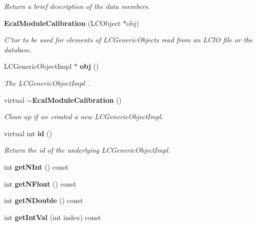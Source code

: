\begin{DoxyCompactItemize}
\begin{DoxyCompactList}\small\item\em Return a brief description of the data members. \item\end{DoxyCompactList}\item 
{\bf EcalModuleCalibration} (LCObject $\ast$obj)
\begin{DoxyCompactList}\small\item\em C'tor to be used for elements of LCGenericObjects read from an LCIO file or the database. \item\end{DoxyCompactList}\item 
LCGenericObjectImpl $\ast$ {\bf obj} ()
\begin{DoxyCompactList}\small\item\em The LCGenericObjectImpl . \item\end{DoxyCompactList}\item 
virtual {\bf $\sim$EcalModuleCalibration} ()\label{classCALICE_1_1EcalModuleCalibration_acc08af0cde6a964ec53ced5f89d97481}

\begin{DoxyCompactList}\small\item\em Clean up if we created a new LCGenericObjectImpl. \item\end{DoxyCompactList}\item 
virtual int {\bf id} ()\label{classCALICE_1_1EcalModuleCalibration_a09b17f1686a33d636d25a83452d87775}

\begin{DoxyCompactList}\small\item\em Return the id of the underlying LCGenericObjectImpl. \item\end{DoxyCompactList}\item 
int {\bfseries getNInt} () const \label{classCALICE_1_1EcalModuleCalibration_a88f003114047f844685d82594b3047b1}

\item 
int {\bfseries getNFloat} () const \label{classCALICE_1_1EcalModuleCalibration_ad5cfd49be32643de01c52ef1a6866401}

\item 
int {\bfseries getNDouble} () const \label{classCALICE_1_1EcalModuleCalibration_aaca3fb44be479000b015e25456138414}

\item 
int {\bfseries getIntVal} (int index) const \label{classCALICE_1_1EcalModuleCalibration_a23c124642eb6c3fa13d7a6a1bad86b55}


\end{DoxyCompactItemize}
